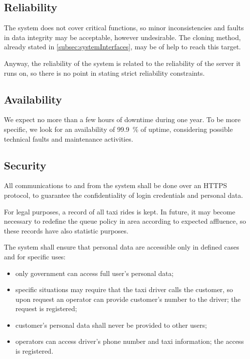 \subsection{Reliability}
The system does not cover critical functions, so minor inconsistencies and faults in data integrity may be acceptable, however undesirable. The cloning method, already stated in \cref{subsec:systemInterfaces}, may be of help to reach this target. 

Anyway, the reliability of the system is related to the reliability of the server it runs on, so there is no point in stating strict reliability constraints.


\subsection{Availability}
We expect no more than a few hours of downtime during one year. To be more specific, we look for an availability of \SI{99,9}{\percent} of uptime, considering possible technical faults and maintenance activities. 


\subsection{Security}
All communications to and from the system shall be done over an HTTPS protocol, to guarantee the confidentiality of login credentials and personal data.

For legal purposes, a record of all taxi rides is kept. In future, it may become necessary to redefine the queue policy in area according to expected affluence, so these records have also statistic purposes.

The system shall ensure that personal data are accessible only in defined cases and for specific uses: 
\begin{itemize}
	
	\item only government can access full user's personal data;
	
	\item specific situations may require that the taxi driver calls the customer, so upon request an operator can provide customer's number to the driver; the request is registered;
	
	\item customer's personal data shall never be provided to other users;
	
	\item operators can access driver's phone number and taxi information; the access is registered.

\end{itemize}


